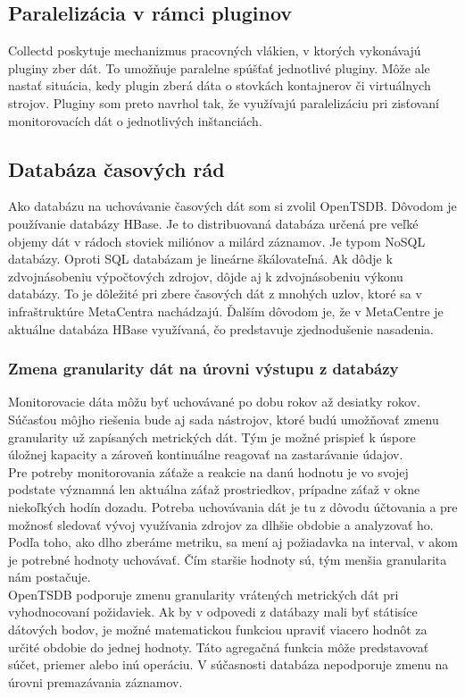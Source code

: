 \documentclass[printed,11pt,twoside,color,cover,table]{fithesis3}
\begin{document}
\subsection{Paralelizácia v rámci pluginov}
Collectd poskytuje mechanizmus pracovných vlákien, v ktorých vykonávajú pluginy zber dát. To umožňuje paralelne spúšťať jednotlivé pluginy.
Môže ale nastať situácia, kedy plugin zberá dáta o stovkách kontajnerov či virtuálnych strojov. Pluginy som preto navrhol tak, že využívajú
paralelizáciu pri zisťovaní monitorovacích dát o jednotlivých inštanciách. 

\subsection{Databáza časových rád}
Ako databázu na uchovávanie časových dát som si zvolil OpenTSDB. Dôvodom je používanie databázy HBase. Je to distribuovaná databáza určená pre veľké objemy dát v rádoch stoviek miliónov a milárd záznamov. 
Je typom NoSQL databázy. Oproti SQL databázam je lineárne škálovateľná. Ak dôdje k zdvojnásobeniu výpočtových zdrojov, dôjde aj k zdvojnásobeniu výkonu databázy. To je dôležité pri zbere časových dát z mnohých
uzlov, ktoré sa v infraštruktúre MetaCentra nachádzajú. Ďalším dôvodom je, že v MetaCentre je aktuálne databáza HBase využívaná, čo predstavuje zjednodušenie nasadenia. 

\subsubsection{Zmena granularity dát na úrovni výstupu z databázy}
Monitorovacie dáta môžu byť uchovávané po dobu rokov až desiatky rokov. Súčasťou môjho riešenia bude aj sada nástrojov, ktoré budú
umožňovať zmenu granularity už zapísaných metrických dát. Tým je možné prispieť k úspore úložnej kapacity a zároveň kontinuálne reagovať na
zastarávanie údajov. 
\\Pre potreby monitorovania záťaže a reakcie na danú hodnotu je vo svojej podstate významná len aktuálna záťaž prostriedkov, prípadne záťaž v okne niekoľkých hodín 
dozadu. Potreba uchovávania dát je tu z dôvodu účtovania a pre možnosť sledovať vývoj využívania zdrojov za dlhšie obdobie a analyzovať ho.
Podľa toho, ako dlho zberáme metriku, sa mení aj požiadavka na interval, v akom je potrebné hodnoty uchovávať. Čím staršie hodnoty sú, tým menšia granularita nám postačuje.
\\OpenTSDB podporuje zmenu granularity vrátených metrických dát pri vyhodnocovaní požidaviek. Ak by v odpovedi z datábazy mali byť státisíce dátových bodov, je možné matematickou funkciou upraviť viacero hodnôt
za určité obdobie  do jednej hodnoty. Táto agregačná funkcia môže predstavovať súčet, priemer alebo inú operáciu. V súčasnosti databáza nepodporuje zmenu na úrovni premazávania záznamov.
  
\end{document}

